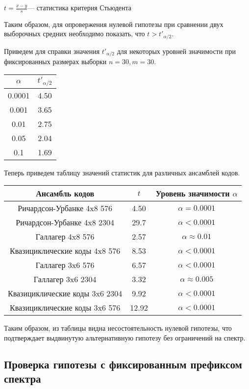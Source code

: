 $t=\frac{\overline{x}-\overline{y}}{s}$--- статистика критерия Стьюдента

Таким образом, для опровержения нулевой гипотезы при сравнении двух выборочных средних необходимо
показать, что $t > t'_{\alpha/2}$.

Приведем для справки значения $t'_{\alpha/2}$ для некоторых уровней значимости при фиксированных
размерах выборки $n=30, m=30$.

\begin{tabular}{|c|c|}
	\hline
	$\alpha$ & $t'_{\alpha/2}$ \\
	\hline
	0.0001 & 4.50 \\
	\hline
	0.001 & 3.65 \\
	\hline
	0.01 & 2.75 \\
	\hline
	0.05 & 2.04 \\
	\hline
	0.1 & 1.69 \\
	\hline
\end{tabular}

Теперь приведем таблицу значений статистик для различных ансамблей кодов.

\begin{tabular}{|c|c|c|}
	\hline
	Ансамбль кодов & $t$ & Уровень значимости $\alpha$\\
	\hline
	Ричардсон-Урбанке 4x8 576 & 4.50 &  $\alpha = 0.0001$\\
	\hline
	Ричардсон-Урбанке 4x8 2304 & 29.7 & $\alpha < 0.0001$ \\
	\hline
	Галлагер 4x8 576 & 2.57 & $\alpha \approx 0.01$ \\
	\hline
	Квазициклические коды 4x8 576 & 8.53 & $\alpha < 0.0001$ \\
	\hline
	Галлагер 3x6 576 & 6.57 & $\alpha < 0.0001$ \\
	\hline
	Галлагер 3x6 2304 & 3.32 & $\alpha \approx 0.005$ \\
	\hline
	Квазициклические коды 3x6 2304 & 9.92 & $\alpha < 0.0001$ \\
	\hline
	Квазициклические коды 3x6 576 & 12.92 & $\alpha < 0.0001$ \\
	\hline
\end{tabular}

Таким образом, из таблицы видна несостоятельность нулевой гипотезы, что подтверждает выдвинутую альтернативную
гипотезу без ограничений на спектр.

\subsection{Проверка гипотезы с фиксированным префиксом спектра}

